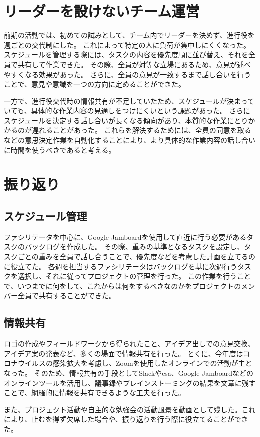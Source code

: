 \section{リーダーを設けないチーム運営}
前期の活動では、初めての試みとして、チーム内でリーダーを決めず、進行役を週ごとの交代制にした。
これによって特定の人に負荷が集中しにくくなった。
スケジュールを管理する際には、タスクの内容を優先度順に並び替え、それを全員で共有して作業できた。
その際、全員が対等な立場にあるため、意見が述べやすくなる効果があった。
さらに、全員の意見が一致するまで話し合いを行うことで、意見や意識を一つの方向に定めることができた。

一方で、進行役交代時の情報共有が不足していたため、スケジュールが決まっていても、具体的な作業内容の見通しをつけにくいという課題があった。
さらにスケジュールを決定する話し合いが長くなる傾向があり、本質的な作業にとりかかるのが遅れることがあった。
これらを解決するためには、全員の同意を取るなどの意思決定作業を自動化することにより、より具体的な作業内容の話し合いに時間を使うべきであると考える。

\section{振り返り}
\subsection{スケジュール管理}
ファシリテータを中心に、Google Jamboardを使用して直近に行う必要があるタスクのバックログを作成した。
その際、重みの基準となるタスクを設定し、タスクごとの重みを全員で話し合うことで、優先度などを考慮した計画を立てるのに役立てた。
各週を担当するファシリテータはバックログを基に次週行うタスクを選択し、それに従ってプロジェクトの管理を行った。
この作業を行うことで、いつまでに何をして、これからは何をするべきなのかをプロジェクトのメンバー全員で共有することができた。

\subsection{情報共有}
ロゴの作成やフィールドワークから得られたこと、アイデア出しでの意見交換、アイデア案の発表など、多くの場面で情報共有を行った。
とくに、今年度はコロナウイルスの感染拡大を考慮し、Zoomを使用したオンラインでの活動が主となった。
そのため、情報共有の手段としてSlackやesa、Google Jamboardなどのオンラインツールを活用し、議事録やブレインストーミングの結果を文章に残すことで、網羅的に情報を共有できるような工夫を行った。

また、プロジェクト活動や自主的な勉強会の活動風景を動画として残した。これにより、止むを得ず欠席した場合や、振り返りを行う際に役立てることができた。
